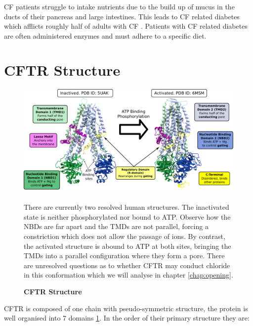 CF patients struggle to intake nutrients due to the build up of mucus in the ducts of their pancreas and large intestines. This leads to CF related diabetes which afflicts roughly half of adults with CF \cite{Kayani2018}. Patients with CF related diabetes are often administered enzymes and must adhere to a specific diet. 

\section{CFTR Structure}

\begin{figure}
	\begin{center}
	\includegraphics[width=\textwidth]{figures/CFTR_structure.pdf}
	\end{center}
	\label{CFTR_structure_domains}
	\captionsetup{singlelinecheck = false, justification=raggedright}
	\caption[CFTR Structure] {\textbf{CFTR Structure}}{There are currently two resolved human structures. The inactivated state is neither phosphorylated nor bound to ATP. Observe how the NBDs are far apart and the TMDs are not parallel, forcing a constriction which does not allow the passage of ions. By contrast, the activated structure is abound to ATP at both sites, bringing the TMDs into a parallel configuration where they form a pore. There are unresolved questions as to whether CFTR may conduct chloride in this conformation which we will analyse in chapter \ref{chap:opening}.} 
\end{figure}
CFTR is composed of one chain with pseudo-symmetric structure, the protein is well organised into 7 domains \ref{CFTR_structure_domains}. In the order of their primary structure they are: 
